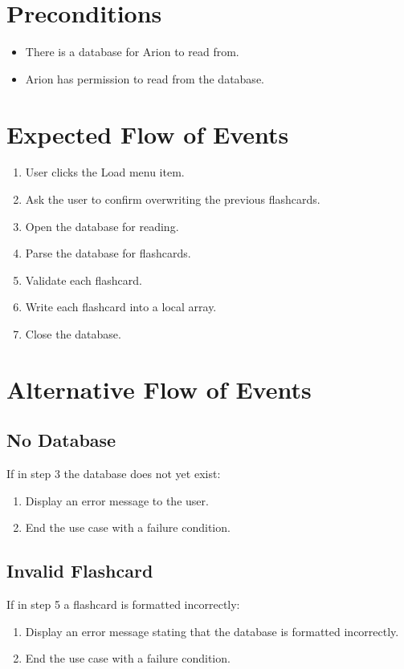 \documentclass{scrreprt}
\begin{document}
\section{Preconditions}
\begin{itemize}
    \item There is a database for Arion to read from.
    \item Arion has permission to read from the database.
\end{itemize}

\section{Expected Flow of Events}
\begin{enumerate}[1.]
    \item User clicks the Load menu item.
    \item Ask the user to confirm overwriting the previous flashcards.
    \item Open the database for reading.
    \item Parse the database for flashcards.
    \item Validate each flashcard.
    \item Write each flashcard into a local array.
    \item Close the database.
\end{enumerate}

\section{Alternative Flow of Events}

    \subsection{No Database}
    If in step 3 the database does not yet exist:
    \begin{enumerate}
        \item Display an error message to the user.
        \item End the use case with a failure condition.
    \end{enumerate}

    \subsection{Invalid Flashcard}
    If in step 5 a flashcard is formatted incorrectly:
    \begin{enumerate}
        \item Display an error message stating that the database is formatted incorrectly.
        \item End the use case with a failure condition.
    \end{enumerate}
\end{document}
